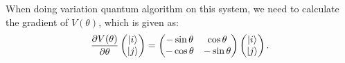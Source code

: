 When doing variation quantum algorithm on this system, we need to calculate the gradient of $V(\theta)$, which is given as:
\begin{equation}
    \frac{\partial V(\theta)}{\partial\theta}\begin{pmatrix}
        \ket{i} \\\ket{j}
    \end{pmatrix}=\begin{pmatrix}
        -\sin\theta & \cos\theta  \\
        -\cos\theta & -\sin\theta
    \end{pmatrix}\begin{pmatrix}
        \ket{i} \\\ket{j}
    \end{pmatrix}.
\end{equation}

